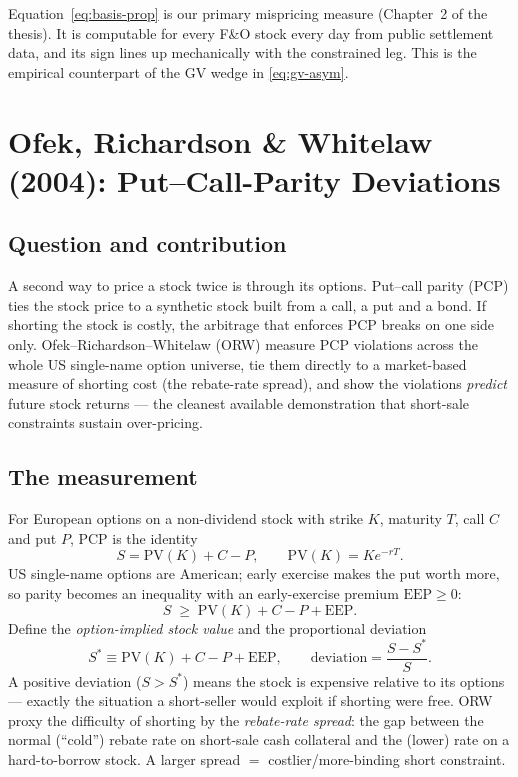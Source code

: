 \begin{takeaway}
Equation~\eqref{eq:basis-prop} is our primary mispricing measure (Chapter~2 of the thesis). It is computable for every F\&O stock every day from public settlement data, and its sign lines up mechanically with the constrained leg. This is the empirical counterpart of the GV wedge in \eqref{eq:gv-asym}.
\end{takeaway}

\section{Ofek, Richardson \& Whitelaw (2004): Put--Call-Parity Deviations}
\label{sec:ofek}

\subsection*{Question and contribution}
A second way to price a stock twice is through its options. Put--call parity (PCP) ties the stock price to a synthetic stock built from a call, a put and a bond. If shorting the stock is costly, the arbitrage that enforces PCP breaks on one side only. Ofek--Richardson--Whitelaw (ORW) measure PCP violations across the whole US single-name option universe, tie them directly to a market-based measure of shorting cost (the rebate-rate spread), and show the violations \emph{predict} future stock returns --- the cleanest available demonstration that short-sale constraints sustain over-pricing.

\subsection*{The measurement}
For European options on a non-dividend stock with strike $K$, maturity $T$, call $C$ and put $P$, PCP is the identity
\begin{equation}
S = \mathrm{PV}(K) + C - P, \qquad \mathrm{PV}(K)=K e^{-rT}. \label{eq:pcp-eu}
\end{equation}
US single-name options are American; early exercise makes the put worth more, so parity becomes an inequality with an early-exercise premium $\mathrm{EEP}\ge 0$:
\begin{equation}
S \;\ge\; \mathrm{PV}(K) + C - P + \mathrm{EEP}. \label{eq:pcp-am}
\end{equation}
Define the \emph{option-implied stock value} and the proportional deviation
\begin{equation}
S^{\ast} \equiv \mathrm{PV}(K) + C - P + \mathrm{EEP}, \qquad \text{deviation} = \frac{S - S^{\ast}}{S}. \label{eq:pcp-dev}
\end{equation}
A positive deviation ($S>S^\ast$) means the stock is expensive relative to its options --- exactly the situation a short-seller would exploit if shorting were free. ORW proxy the difficulty of shorting by the \emph{rebate-rate spread}: the gap between the normal (``cold'') rebate rate on short-sale cash collateral and the (lower) rate on a hard-to-borrow stock. A larger spread $=$ costlier/more-binding short constraint.

